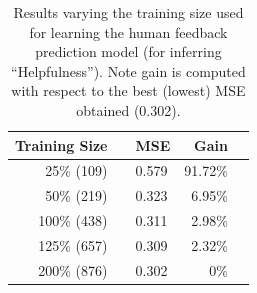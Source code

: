 \documentclass[11pt]{article}
\renewcommand{\cite}[1]{\citep{#1}}
\newcommand{\rev}[1]{\textcolor{blue}{#1}}
\begin{document}
\begin{table}[ht]
\centering
\vspace{4mm}
\small
\renewcommand{\arraystretch}{1.2} %
\begin{tabular}{rcl r c}
\toprule
\textbf{Training Size} & & \textbf{MSE} & \textbf{Gain} & \\
\midrule
25\% (109) && 0.579 & 91.72\% \\
50\% (219) && 0.323 & 6.95\% \\
100\% (438) && 0.311 & 2.98\% \\
125\% (657) && 0.309 & 2.32\% \\
200\% (876) && 0.302 & 0\% \\
\bottomrule
\end{tabular}
\caption{%
Results varying the training size used for learning the human feedback prediction model (for inferring ``Helpfulness''). 
Note gain is computed with respect to the best (lowest) MSE obtained (0.302).
}%

\label{table:varying-training-size}
\end{table}
\end{document}
